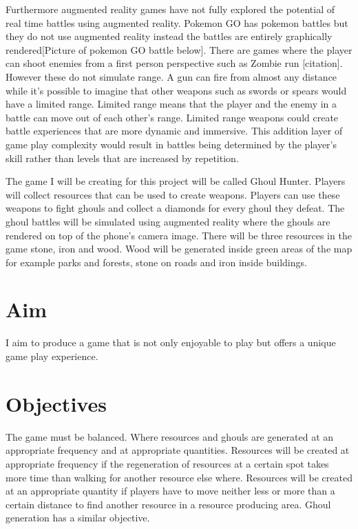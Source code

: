 \documentclass[11pt,openright,a4paper]{report}
\begin{document}
	Furthermore augmented reality games have not fully explored the potential of real time battles using augmented reality. Pokemon GO has pokemon battles but they do not use augmented reality instead the battles are entirely graphically rendered[Picture of pokemon GO battle below]. There are games where the player can shoot enemies from a first person perspective such as Zombie run [citation]. However these do not simulate range. A gun can fire from almost any distance while it's possible to imagine that other weapons such as swords or spears would have a limited range. Limited range means that the player and the enemy in a battle can move out of each other's range.  Limited range weapons could create battle experiences that are more dynamic and immersive. This addition layer of game play complexity would result in battles being determined by the player's skill rather than levels that are increased by repetition.   
	
	The game I will be creating for this project will be called Ghoul Hunter. Players will collect resources that can be used to create weapons. Players can use these weapons to fight ghouls and collect a diamonds for every ghoul they defeat. The ghoul battles will be simulated using augmented reality where the ghouls are rendered on top of the phone's camera image. There will be three resources in the game stone, iron and wood. Wood will be generated inside green areas of the map for example parks and forests, stone on roads and iron inside buildings.
	
	\section{Aim}
	I aim to produce a game that is not only enjoyable to play but offers a unique game play experience.
	
	\section{Objectives}
	The game must be balanced. Where resources and ghouls are generated at an appropriate frequency and at appropriate quantities. Resources will be created at appropriate frequency if the regeneration of resources at a certain spot takes more time than walking for another resource else where. Resources will be created at an appropriate quantity if players have to move neither less or more than a certain distance to find another resource in a resource producing area. Ghoul generation has a similar objective.
	
\end{document}
